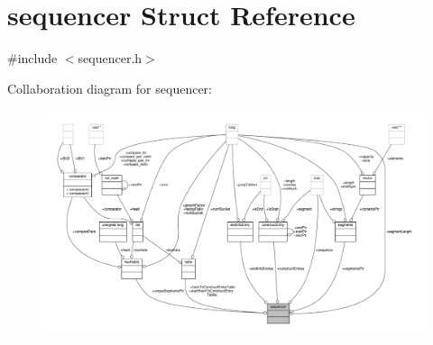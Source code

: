 \hypertarget{structsequencer}{\section{sequencer Struct Reference}
\label{structsequencer}
}


{\ttfamily \#include $<$sequencer.\-h$>$}



Collaboration diagram for sequencer\-:
\nopagebreak
\begin{figure}[H]
\begin{center}
\leavevmode
\includegraphics[width=350pt]{structsequencer__coll__graph}
\end{center}
\end{figure}
